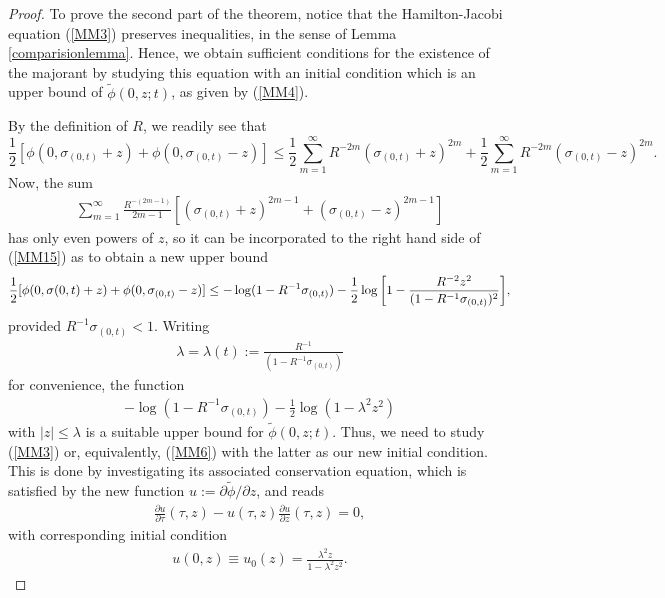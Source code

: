 \documentclass[12pt,twoside]{amsart}
\newcommand{\beq}{\begin{equation}}
\newcommand{\eeq}{\end{equation}}
\numberwithin{equation}{section}
\begin{document}
\begin{proof}
To prove the second part of the theorem, notice that the Hamilton-Jacobi equation (\ref{MM3}) preserves inequalities, in the sense of Lemma \ref{comparisionlemma}. Hence, we obtain sufficient conditions for the existence of the majorant by studying this equation with an initial condition which is an upper bound of $\tilde{\phi}(0,z;t)$, as given by (\ref{MM4}).


By the definition of $R$, we readily see that
\beq
\frac{1}{2}[\phi(0,\sigma_{(0,t)}+z)+\phi(0,\sigma_{(0,t)}-z)] \le \frac{1}{2}\sum_{m=1}^{\infty}R^{-2m}(\sigma_{(0,t)}+z)^{2m}+\frac{1}{2}\sum_{m=1}^{\infty}R^{-2m}(\sigma_{(0,t)}-z)^{2m}. \label{MM15}
\eeq
Now, the sum
\begin{eqnarray}
\sum_{m=1}^{\infty}\frac{R^{-(2m-1)}}{2m-1}[(\sigma_{(0,t)}+z)^{2m-1}+(\sigma_{(0,t)}-z)^{2m-1}] \label{MM16}
\end{eqnarray}
has only even powers of $z$, so it can be incorporated to the right hand side of (\ref{MM15}) as to obtain a new upper bound
\beq
\frac{1}{2}[\phi(0,\sigma(0,t)+z)+\phi(0,\sigma_{(0,t)}-z)] \le -\log(1-R^{-1}\sigma_{(0,t)})-\frac{1}{2}\log\bigg{[}1-\frac{R^{-2}z^{2}}{(1-R^{-1}\sigma_{(0,t)})^{2}}\bigg{]}, \label{MM17}
\eeq
provided $R^{-1}\sigma_{(0,t)} < 1$. Writing 
\begin{eqnarray}
\lambda = \lambda(t) := \frac{R^{-1}}{(1-R^{-1}\sigma_{(0,t)})} \label{MM18}
\end{eqnarray}
for convenience, the function
\begin{eqnarray}
 -\log(1-R^{-1}\sigma_{(0,t)})-\frac{1}{2}\log(1-\lambda^{2}z^{2}) \nonumber
\end{eqnarray}
with $|z| \le \lambda$ is a suitable upper bound for $\tilde{\phi}(0,z;t)$. Thus, we need to study (\ref{MM3}) or, equivalently, (\ref{MM6}) with the latter as our new initial condition. This is done by investigating its associated conservation equation, which is satisfied by the new function $u := \partial \tilde{\phi}/\partial z $, and reads
\begin{eqnarray}
\frac{\partial u}{\partial \tau}(\tau,z) - u(\tau,z) \frac{\partial u}{\partial z}(\tau,z) = 0, \label{MM19}
\end{eqnarray}
 with corresponding initial condition
\begin{eqnarray}
u(0,z) \equiv u_{0}(z) = \frac{\lambda^{2}z}{1-\lambda^{2}z^{2}}. \nonumber
\end{eqnarray}


\end{proof}
\end{document}
